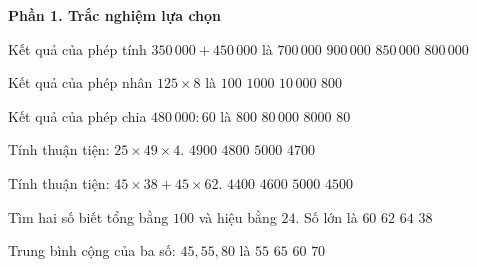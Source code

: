 \textbf{Phần 1. Trắc nghiệm lựa chọn}

\begin{ex} %
Kết quả của phép tính $350\,000 + 450\,000$ là
\choice
{$700\,000$}
{$900\,000$}
{$850\,000$}
{\True $800\,000$}
\end{ex}

\begin{ex} %
Kết quả của phép nhân $125 \times 8$ là
\choice
{$100$}
{\True $1000$}
{$10\,000$}
{$800$}
\end{ex}

\begin{ex} %
Kết quả của phép chia $480\,000 : 60$ là
\choice
{$800$}
{$80\,000$}
{\True $8000$}
{$80$}
\end{ex}

\begin{ex} %
Tính thuận tiện: $25 \times 49 \times 4$.
\choice
{\True $4900$}
{$4800$}
{$5000$}
{$4700$}
\end{ex}

\begin{ex} %
Tính thuận tiện: $45 \times 38 + 45 \times 62$.
\choice
{$4400$}
{$4600$}
{$5000$}
{\True $4500$}
\end{ex}

\begin{ex} %
Tìm hai số biết tổng bằng $100$ và hiệu bằng $24$. Số lớn là
\choice
{$60$}
{\True $62$}
{$64$}
{$38$}
\end{ex}

\begin{ex} %
Trung bình cộng của ba số: $45, 55, 80$ là
\choice
{$55$}
{$65$}
{\True $60$}
{$70$}
\end{ex}

